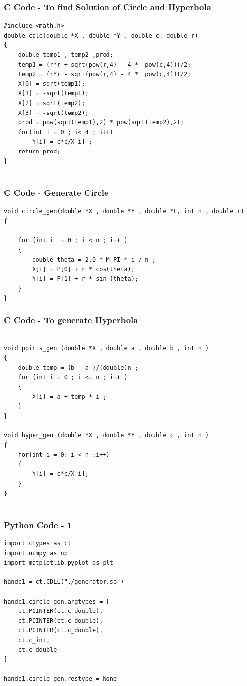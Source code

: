 \documentclass{beamer}
\begin{document}
\begin{frame}[fragile]
    \frametitle{C Code - To find Solution of Circle and Hyperbola }
    \begin{lstlisting}
#include <math.h>
double calc(double *X , double *Y , double c, double r)
{
    double temp1 , temp2 ,prod; 
    temp1 = (r*r + sqrt(pow(r,4) - 4 *  pow(c,4)))/2;
    temp2 = (r*r - sqrt(pow(r,4) - 4 *  pow(c,4)))/2; 
    X[0] = sqrt(temp1);
    X[1] = -sqrt(temp1);
    X[2] = sqrt(temp2);
    X[3] = -sqrt(temp2);
    prod = pow(sqrt(temp1),2) * pow(sqrt(temp2),2);
    for(int i = 0 ; i< 4 ; i++)
        Y[i] = c*c/X[i] ;
    return prod;
}


    \end{lstlisting}
\end{frame}

\begin{frame}[fragile]
    \frametitle{C Code - Generate Circle }
    \begin{lstlisting}
void circle_gen(double *X , double *Y , double *P, int n , double r)
{
 
    for (int i  = 0 ; i < n ; i++ )
    {
        double theta = 2.0 * M_PI * i / n ; 
        X[i] = P[0] + r * cos(theta);
        Y[i] = P[1] + r * sin (theta); 
    }   
}

\end{lstlisting}
\end{frame}
\begin{frame}[fragile]
    \frametitle{C Code - To generate Hyperbola }
    \begin{lstlisting}
	
void points_gen (double *X , double a , double b , int n )
{
    double temp = (b - a )/(double)n ; 
    for (int i = 0 ; i <= n ; i++ )
    {
        X[i] = a + temp * i ; 
    }
}

void hyper_gen (double *X , double *Y , double c , int n )
{
    for(int i = 0; i < n ;i++)
    {
        Y[i] = c*c/X[i];
    }
}


\end{lstlisting}
\end{frame}


\begin{frame}[fragile]
    \frametitle{Python Code - 1}
    \begin{lstlisting}
import ctypes as ct
import numpy as np
import matplotlib.pyplot as plt

handc1 = ct.CDLL("./generator.so")

handc1.circle_gen.argtypes = [
    ct.POINTER(ct.c_double),
    ct.POINTER(ct.c_double),
    ct.POINTER(ct.c_double),
    ct.c_int,
    ct.c_double
]

handc1.circle_gen.restype = None

\end{lstlisting}
\end{frame}
\end{document}
